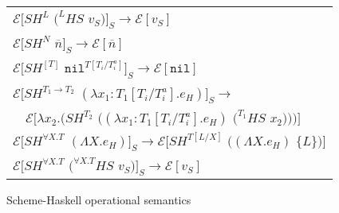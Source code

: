 \begin{figure}[p]
\centering
\begin{tabular}{l}
\vspace{5pt}

$\mathscr{E}[SH^{L}$ $(^{L}HS$ $v_{S})]_{S}\rightarrow\mathscr{E}[v_{S}]$ \\

\vspace{5pt}

$\mathscr{E}[SH^{N}$ $\overline{n}]_{S}\rightarrow\mathscr{E}[\overline{n}]$ \\

\vspace{5pt}

$\mathscr{E}[SH^{[T]}$ $\mathtt{nil}^{T[T_{i}/T_{i}^{a}]}]_{S}\rightarrow\mathscr{E}[\mathtt{nil}]$ \\

\vspace{5pt}

$\mathscr{E}[SH^{T_{1}\rightarrow T_{2}}$ $(\lambda x_{1}:T_{1}[T_{i}/T_{i}^{a}].e_{H})]_{S}\rightarrow$ \\

\vspace{5pt}

$\quad\mathscr{E}[\lambda x_{2}.(SH^{T_{2}}$ $((\lambda x_{1}:T_{1}[T_{i}/T_{i}^{a}].e_{H})$ $(^{T_{1}}HS$ $x_{2})))]$ \\

\vspace{5pt}

$\mathscr{E}[SH^{\forall X.T}$ $(\Lambda X.e_{H})]_{S}\rightarrow\mathscr{E}[SH^{T[L/X]}$ $((\Lambda X.e_{H})$ $\lbrace L\rbrace)]$ \\

\vspace{5pt}

$\mathscr{E}[SH^{\forall X.T}$ $(^{\forall X.T}HS$ $v_{S})]_{S}\rightarrow\mathscr{E}[v_{S}]$ \\
\end{tabular}
\caption{Scheme-Haskell operational semantics}
\label{isos}
\end{figure}